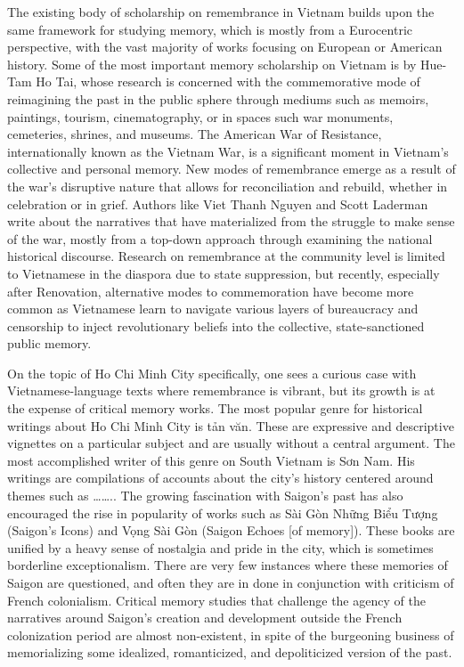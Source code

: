 The existing body of scholarship on remembrance in Vietnam builds upon the same framework for studying memory, which is mostly from a Eurocentric perspective, with the vast majority of works focusing on European or American history. Some of the most important memory scholarship on Vietnam is by Hue-Tam Ho Tai, whose research is concerned with the commemorative mode of reimagining the past in the public sphere through mediums such as memoirs, paintings, tourism, cinematography, or in spaces such war monuments, cemeteries, shrines, and museums.  The American War of Resistance, internationally known as the Vietnam War, is a significant moment in Vietnam’s collective and personal memory. New modes of remembrance emerge as a result of the war’s disruptive nature that allows for reconciliation and rebuild, whether in celebration or in grief. Authors like Viet Thanh Nguyen and Scott Laderman write about the narratives that have materialized from the struggle to make sense of the war, mostly from a top-down approach through examining the national historical discourse.  Research on remembrance at the community level is limited to Vietnamese in the diaspora due to state suppression, but recently, especially after Renovation, alternative modes to commemoration have become more common as Vietnamese learn to navigate various layers of bureaucracy and censorship to inject revolutionary beliefs into the collective, state-sanctioned public memory. 

On the topic of Ho Chi Minh City specifically, one sees a curious case with Vietnamese-language texts where remembrance is vibrant, but its growth is at the expense of critical memory works. The most popular genre for historical writings about Ho Chi Minh City is tản văn. These are expressive and descriptive vignettes on a particular subject and are usually without a central argument.  The most accomplished writer of this genre on South Vietnam is Sơn Nam. His writings are compilations of accounts about the city’s history centered around themes such as ……..  The growing fascination with Saigon’s past has also encouraged the rise in popularity of works such as Sài Gòn Những Biểu Tượng (Saigon’s Icons) and Vọng Sài Gòn (Saigon Echoes [of memory]). These books are unified by a heavy sense of nostalgia and pride in the city, which is sometimes borderline exceptionalism.  There are very few instances where these memories of Saigon are questioned, and often they are in done in conjunction with criticism of French colonialism.  Critical memory studies that challenge the agency of the narratives around Saigon’s creation and development outside the French colonization period are almost non-existent, in spite of the burgeoning business of memorializing some idealized, romanticized, and depoliticized version of the past. 

